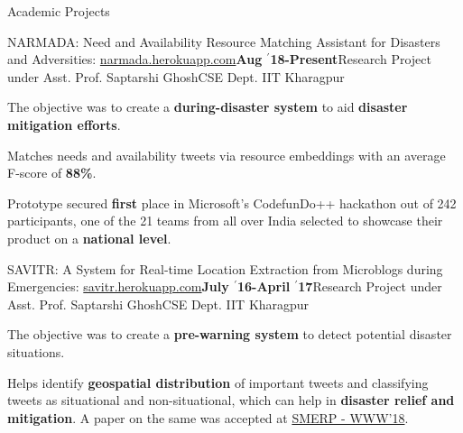 \documentclass{resume} %
\begin{document}
\begin{rSection}{Academic Projects}
\begin{rSubsection}{ \large NARMADA: Need and Availability Resource Matching Assistant for Disasters and Adversities: \href{http://narmada.herokuapp.com}{narmada.herokuapp.com}}{\textbf{\large Aug $^{\prime}$18-Present}}{Research Project under Asst. Prof. Saptarshi Ghosh}{CSE Dept. IIT Kharagpur}
\item The objective was to create a \textbf{during-disaster system} to aid \textbf{disaster mitigation efforts}.
\item  Matches needs and availability tweets via resource embeddings with an average F-score of \textbf{88\%}.
\item Prototype secured \textbf{first} place in Microsoft's CodefunDo++ hackathon out of 242 participants, one of the 21 teams from all over India selected to showcase their product on a \textbf{national level}.
\end{rSubsection}


\begin{rSubsection}{ \large SAVITR: A System for Real-time Location Extraction from Microblogs during Emergencies: \href{http://savitr.herokuapp.com}{savitr.herokuapp.com}}{\textbf{\large July $^{\prime}$16-April $^{\prime}$17}}{Research Project under Asst. Prof. Saptarshi Ghosh}{CSE Dept. IIT Kharagpur}
\item The objective was to create a \textbf{pre-warning system} to detect potential disaster situations. 
\item Helps identify \textbf{geospatial distribution} of important tweets and classifying tweets as situational and non-situational, which can help in \textbf{disaster relief and mitigation}. A paper on the same was accepted at \href{https://www.cse.iitk.ac.in/users/kripa/smerp2018/}{SMERP - WWW'18}.
\end{rSubsection}



\end{rSection}
\end{document}
